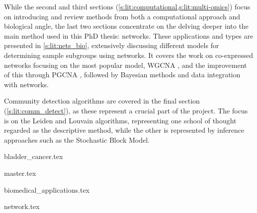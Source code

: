 While the second and third sections  (\cref{s:lit:computational,s:lit:multi-omics}) focus on introducing and review methods from both a computational approach and biological angle, the last two sections concentrate on the delving deeper into the main method used in this PhD thesis: networks. These applications and types are presented in \cref{s:lit:nets_bio}, extensively discussing different models for determining sample subgroups using networks. It covers the work on co-expressed networks focusing on the most popular model, WGCNA \cite{Langfelder2008-sn}, and the improvement of this through PGCNA \cite{Care2019-ij}, followed by Bayesian methods and data integration with networks.

Community detection algorithms are covered in the final section (\cref{s:lit:comm_detect}), as these represent a crucial part of the project. The focus is on the Leiden and Louvain algorithms, representing one school of thought regarded as the descriptive method, while the other is represented by inference approaches such as the Stochastic Block Model.



{bladder_cancer.tex}

\pagebreak

{master.tex}

\newpage

{biomedical_applications.tex}


\pagebreak

{network.tex}



